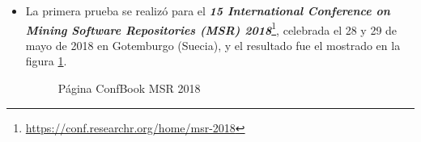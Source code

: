 \documentclass[a4paper, 12pt]{book}
\begin{document}
\begin{itemize}
\item La primera prueba se realizó para el \textbf{\textit{15 International Conference on Mining Software Repositories (MSR) 2018}}\footnote{\url{https://conf.researchr.org/home/msr-2018}}, celebrada el 28 y 29 de mayo de 2018 en Gotemburgo (Suecia), y el resultado fue el mostrado en la figura \ref{fig:imgMSR}.
\begin{figure}[h!]
	\centering
	\caption{Página ConfBook MSR 2018}
	\label{fig:imgMSR}
\end{figure}


\end{itemize}
\end{document}
